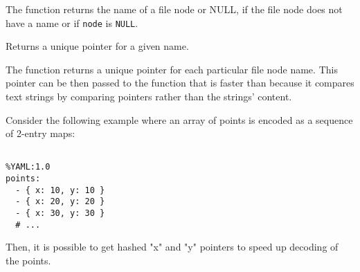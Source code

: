 
\begin{description}
\end{description}

The function returns the name of a file node or NULL, if the file node does not have a name or if \texttt{node} is \texttt{NULL}.


Returns a unique pointer for a given name.


\begin{description}
\end{description}

The function returns a unique pointer for
each particular file node name. This pointer can be then passed to the
 function that is faster than 
because it compares text strings by comparing pointers rather than the
strings' content.

Consider the following example where an array of points is encoded as a sequence of 2-entry maps:

\begin{lstlisting}

%YAML:1.0
points:
  - { x: 10, y: 10 }
  - { x: 20, y: 20 }
  - { x: 30, y: 30 }
  # ...

\end{lstlisting}

Then, it is possible to get hashed "x" and "y" pointers to speed up decoding of the points.

